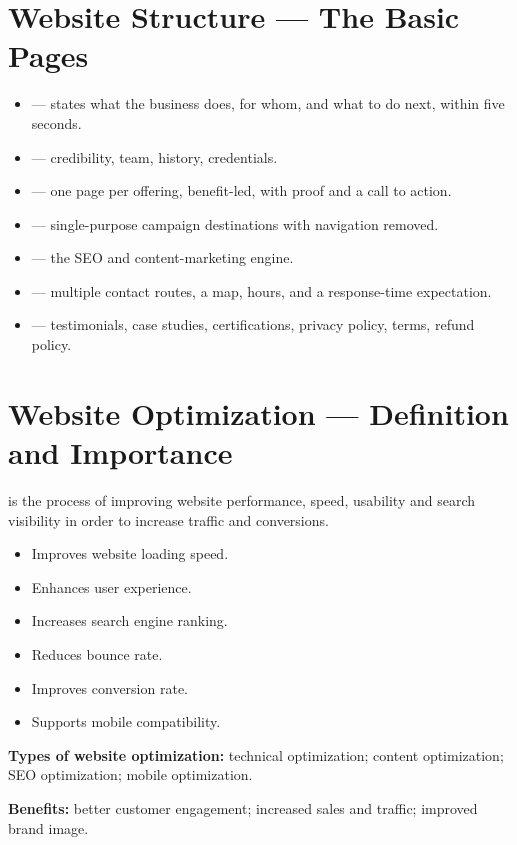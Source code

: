 \documentclass{MMTextbook}
\begin{document}
\section{Website Structure --- The Basic Pages}

\begin{itemize}
\item {} --- states what the business does, for whom, and what to do
      next, within five seconds.
\item {} --- credibility, team, history, credentials.
\item {} --- one page per offering, benefit-led,
      with proof and a call to action.
\item {} --- single-purpose campaign destinations with
      navigation removed.
\item {} --- the SEO and content-marketing engine.
\item {} --- multiple contact routes, a map, hours, and a
      response-time expectation.
\item {} --- testimonials, case studies, certifications, privacy
      policy, terms, refund policy.
\end{itemize}

\section{Website Optimization --- Definition and Importance}

\begin{definitionbox}
 is the process of
improving website performance, speed, usability and search visibility in order to
increase traffic and conversions.
\end{definitionbox}

\begin{exambox}
\begin{itemize}
\item Improves website loading speed.
\item Enhances user experience.
\item Increases search engine ranking.
\item Reduces bounce rate.
\item Improves conversion rate.
\item Supports mobile compatibility.
\end{itemize}

\smallskip
\textbf{Types of website optimization:} technical optimization; content
optimization; SEO optimization; mobile optimization.

\smallskip
\textbf{Benefits:} better customer engagement; increased sales and traffic;
improved brand image.
\end{exambox}
\end{document}
